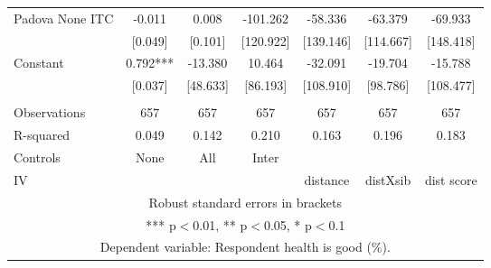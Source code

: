 \begin{tabular}{lcccccc}
Padova None ITC & -0.011 & 0.008 & -101.262 & -58.336 & -63.379 & -69.933 \\
 & [0.049] & [0.101] & [120.922] & [139.146] & [114.667] & [148.418] \\
Constant & 0.792*** & -13.380 & 10.464 & -32.091 & -19.704 & -15.788 \\
 & [0.037] & [48.633] & [86.193] & [108.910] & [98.786] & [108.477] \\
 &  &  &  &  &  &  \\
Observations & 657 & 657 & 657 & 657 & 657 & 657 \\
R-squared & 0.049 & 0.142 & 0.210 & 0.163 & 0.196 & 0.183 \\
Controls & None & All & Inter &  &  &  \\
 IV &  &  &  & distance & distXsib & dist score \\ \hline
\multicolumn{7}{c}{ Robust standard errors in brackets} \\
\multicolumn{7}{c}{ *** p$<$0.01, ** p$<$0.05, * p$<$0.1} \\
\multicolumn{7}{c}{ Dependent variable: Respondent health is good (\%).} \\
\end{tabular}
